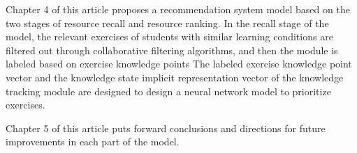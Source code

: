 Chapter 4 of this article proposes a recommendation system model based on the two stages of resource recall and resource ranking. In the recall stage of the model, the relevant exercises of students with similar learning conditions are filtered out through collaborative filtering algorithms, and then the module is labeled based on exercise knowledge points The labeled exercise knowledge point vector and the knowledge state implicit representation vector of the knowledge tracking module are designed to design a neural network model to prioritize exercises.

Chapter 5 of this article puts forward conclusions and directions for future improvements in each part of the model.

